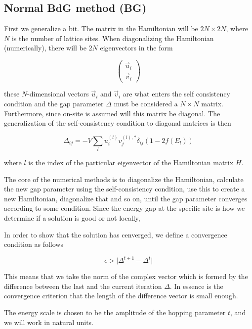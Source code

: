 \documentclass[11pt]{article}
\begin{document}
\subsection{ Normal BdG method (BG) }

First we generalize a bit. The matrix in the Hamiltonian will be $2N \times 2N$, where $N$ is the number of lattice sites. When diagonalizing the Hamiltonian (numerically), there will be $2N$ eigenvectors in the form

\begin{equation}
	\begin{pmatrix} \vec{u}_i \\ \vec{v}_i \end{pmatrix} 
\end{equation}

these $N$-dimensional vectors $\vec{u}_i$ and $\vec{v}_i$ are what enters the self consistency condition and the gap parameter $\Delta$ must be considered a $N\times N$ matrix. Furthermore, since on-site is assumed will this matrix be diagonal. The generalization of the self-consistency condition to diagonal matrices is then

\begin{equation}
	\Delta_{ij} = -V \sum_l u_i^{(l)} v_j^{(l),*} \delta_{ij} (1 - 2f(E_l))
\end{equation}

where $l$ is the index of the particular eigenvector of the Hamiltonian matrix $H$. 

The core of the numerical methods is to diagonalize the Hamiltonian, calculate the new gap parameter using the self-consistency condition, use this to create a new Hamiltonian, diagonalize that and so on, until the gap parameter converges according to some condition. Since the energy gap at the specific site is how we determine if a solution is good or not locally, 

In order to show that the solution has cenverged, we define a convergence condition as follows

\begin{equation}
  \epsilon > \lvert \Delta^{t+1} - \Delta^{t} \rvert 
\end{equation}

This means that we take the norm of the complex vector which is formed by the difference between the last and the current iteration $\Delta$. In essence is the convergence criterion that the length of the difference vector is small enough. 

The energy scale is chosen to be the amplitude of the hopping parameter $t$, and we will work in natural units. 
\end{document}
